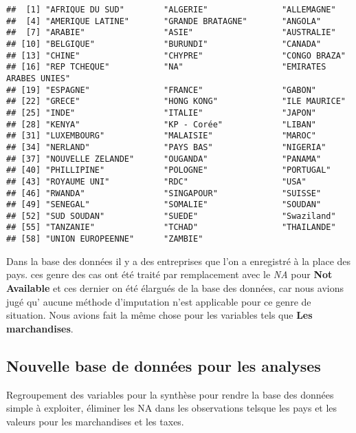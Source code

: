 \documentclass[
]{book}
\begin{document}
\begin{verbatim}
##  [1] "AFRIQUE DU SUD"        "ALGERIE"               "ALLEMAGNE"            
##  [4] "AMERIQUE LATINE"       "GRANDE BRATAGNE"       "ANGOLA"               
##  [7] "ARABIE"                "ASIE"                  "AUSTRALIE"            
## [10] "BELGIQUE"              "BURUNDI"               "CANADA"               
## [13] "CHINE"                 "CHYPRE"                "CONGO BRAZA"          
## [16] "REP TCHEQUE"           "NA"                    "EMIRATES ARABES UNIES"
## [19] "ESPAGNE"               "FRANCE"                "GABON"                
## [22] "GRECE"                 "HONG KONG"             "ILE MAURICE"          
## [25] "INDE"                  "ITALIE"                "JAPON"                
## [28] "KENYA"                 "KP - Corée"            "LIBAN"                
## [31] "LUXEMBOURG"            "MALAISIE"              "MAROC"                
## [34] "NERLAND"               "PAYS BAS"              "NIGERIA"              
## [37] "NOUVELLE ZELANDE"      "OUGANDA"               "PANAMA"               
## [40] "PHILLIPINE"            "POLOGNE"               "PORTUGAL"             
## [43] "ROYAUME UNI"           "RDC"                   "USA"                  
## [46] "RWANDA"                "SINGAPOUR"             "SUISSE"               
## [49] "SENEGAL"               "SOMALIE"               "SOUDAN"               
## [52] "SUD SOUDAN"            "SUEDE"                 "Swaziland"            
## [55] "TANZANIE"              "TCHAD"                 "THAILANDE"            
## [58] "UNION EUROPEENNE"      "ZAMBIE"
\end{verbatim}

Dans la base des données il y a des entreprises que l'on a enregistré à la place des pays. ces genre des cas ont été traité par remplacement avec le \emph{NA} pour \textbf{Not Available} et ces dernier on été élargués de la base des données, car nous avions jugé qu' aucune méthode d'imputation n'est applicable pour ce genre de situation. Nous avions fait la même chose pour les variables tels que \textbf{Les marchandises}.

\hypertarget{nouvelle-base-de-donnuxe9es-pour-les-analyses}{%
\subsection{Nouvelle base de données pour les analyses}\label{nouvelle-base-de-donnuxe9es-pour-les-analyses}}

Regroupement des variables pour la synthèse pour rendre la base des données simple à exploiter, éliminer les NA dans les observations telsque les pays et les valeurs pour les marchandises et les taxes.
\end{document}
